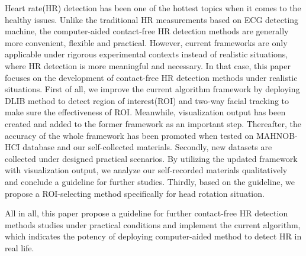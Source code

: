 \begin{enabstract}
Heart rate(HR) detection has been one of the hottest topics when it comes to the healthy issues. Unlike the traditional HR measurements based on ECG detecting machine, the computer-aided contact-free HR detection methods are generally more convenient, flexible and practical. However, current frameworks are only applicable under rigorous experimental contexts instead of realistic situations, where HR detection is more meaningful and necessary. In that case, this paper focuses on the development of contact-free HR detection methods under realistic situations. First of all, we improve the current algorithm framework by deploying DLIB method to detect region of interest(ROI) and two-way facial tracking to make sure the effectiveness of ROI. Meanwhile, visualization output has been created and added to the former framework as an important step. Thereafter, the accuracy of the whole framework has been promoted when tested on MAHNOB-HCI database and our self-collected materials. Secondly, new datasets are collected under designed practical scenarios. By utilizing the updated framework with visualization output, we analyze our self-recorded materials qualitatively and conclude a guideline for further studies. Thirdly, based on the guideline, we propose a ROI-selecting method specifically for head rotation situation. 

All in all, this paper propose a guideline for further contact-free HR detection methods studies under practical conditions and implement the current algorithm, which indicates the potency of deploying computer-aided method to detect HR in real life.


\end{enabstract}
